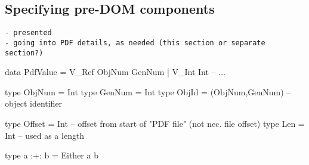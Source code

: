 \subsection{Specifying pre-DOM components}
\begin{lstlisting}[style=meta]
- presented
- going into PDF details, as needed (this section or separate section?)
\end{lstlisting}

\iffalse  %
\begin{code}
{-# LANGUAGE EmptyDataDecls, TypeOperators, LambdaCase #-}
module Spec where

import           Control.Monad
import           Data.Char
import           Data.Foldable(foldlM)
import qualified Data.Map as M
import           Data.Map(Map)

\end{code}
\fi

\begin{code}
data PdfValue = V_Ref ObjNum GenNum
              | V_Int Int
              -- ...

type ObjNum = Int
type GenNum = Int
type ObjId  = (ObjNum,GenNum) -- object identifier

type Offset = Int    -- offset from start of "PDF file" (not nec. file offset)
type Len    = Int    -- used as a length

type a :+: b = Either a b

\end{code}

